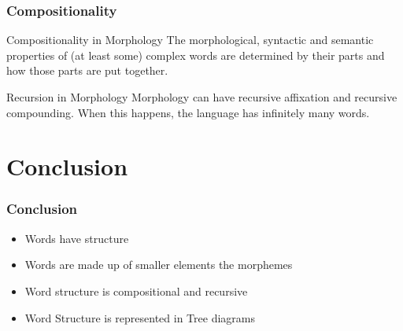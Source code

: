 \begin{frame}
  \frametitle{Compositionality}

  \begin{block}
    {Compositionality in Morphology}
The morphological, syntactic and semantic properties of (at least some) complex words are determined by their parts and how those parts are put together.
  \end{block}
\end{frame}


\begin{frame}
  \begin{block}
    {Recursion in Morphology}
Morphology can have recursive affixation and recursive compounding.  When this happens, the language has infinitely many words.   
\end{block}
\end{frame}

\section{Conclusion}
\begin{frame}
  \frametitle{Conclusion}
  \begin{itemize}
  \item Words have structure
  \item Words are made up of smaller elements the morphemes
  \item Word structure is compositional and recursive
  \item Word Structure is represented in Tree diagrams
  \end{itemize}






\end{frame}



